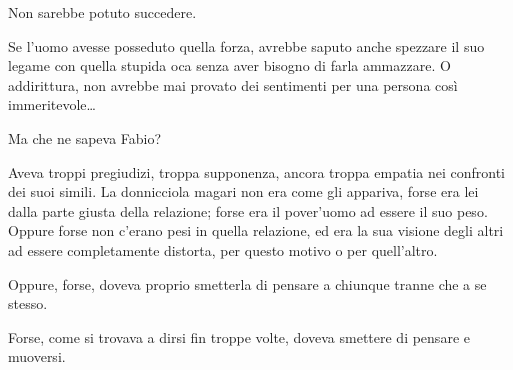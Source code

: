 Non sarebbe potuto succedere. 

Se l'uomo avesse posseduto quella forza, avrebbe saputo anche spezzare il suo legame con quella stupida oca senza aver bisogno di farla ammazzare. O addirittura, non avrebbe mai provato dei sentimenti per una persona così immeritevole\ldots

Ma che ne sapeva Fabio? 

Aveva troppi pregiudizi, troppa supponenza, ancora troppa empatia nei confronti dei suoi simili. La donnicciola magari non era come gli appariva, forse era lei dalla parte giusta della relazione; forse era il pover'uomo ad essere il suo peso. Oppure forse non c'erano pesi in quella relazione, ed era la sua visione degli altri ad essere completamente distorta, per questo motivo o per quell'altro. 

Oppure, forse, doveva proprio smetterla di pensare a chiunque tranne che a se stesso. 

Forse, come si trovava a dirsi fin troppe volte, doveva smettere di pensare e muoversi.
